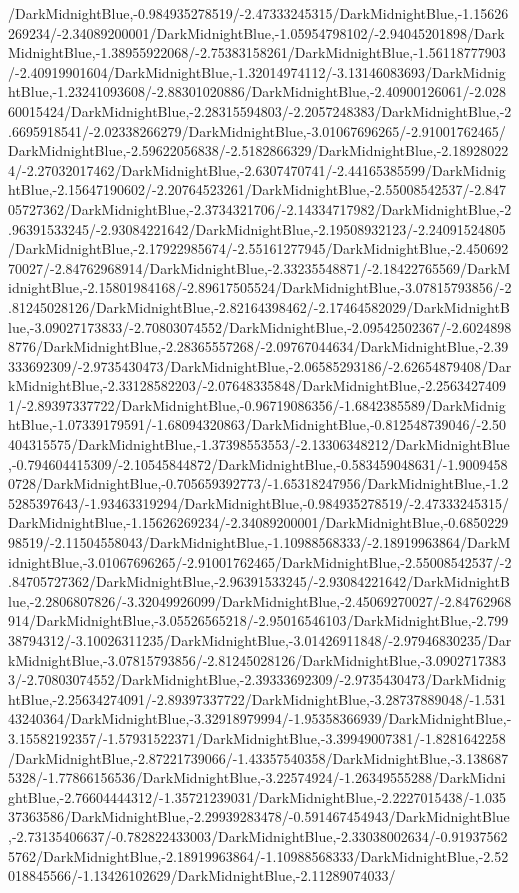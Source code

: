 {\begin{tikzternal}
/DarkMidnightBlue,-0.984935278519/-2.47333245315/DarkMidnightBlue,-1.15626269234/-2.34089200001/DarkMidnightBlue,-1.05954798102/-2.94045201898/DarkMidnightBlue,-1.38955922068/-2.75383158261/DarkMidnightBlue,-1.56118777903/-2.40919901604/DarkMidnightBlue,-1.32014974112/-3.13146083693/DarkMidnightBlue,-1.23241093608/-2.88301020886/DarkMidnightBlue,-2.40900126061/-2.02860015424/DarkMidnightBlue,-2.28315594803/-2.2057248383/DarkMidnightBlue,-2.6695918541/-2.02338266279/DarkMidnightBlue,-3.01067696265/-2.91001762465/DarkMidnightBlue,-2.59622056838/-2.5182866329/DarkMidnightBlue,-2.189280224/-2.27032017462/DarkMidnightBlue,-2.6307470741/-2.44165385599/DarkMidnightBlue,-2.15647190602/-2.20764523261/DarkMidnightBlue,-2.55008542537/-2.84705727362/DarkMidnightBlue,-2.3734321706/-2.14334717982/DarkMidnightBlue,-2.96391533245/-2.93084221642/DarkMidnightBlue,-2.19508932123/-2.24091524805/DarkMidnightBlue,-2.17922985674/-2.55161277945/DarkMidnightBlue,-2.45069270027/-2.84762968914/DarkMidnightBlue,-2.33235548871/-2.18422765569/DarkMidnightBlue,-2.15801984168/-2.89617505524/DarkMidnightBlue,-3.07815793856/-2.81245028126/DarkMidnightBlue,-2.82164398462/-2.17464582029/DarkMidnightBlue,-3.09027173833/-2.70803074552/DarkMidnightBlue,-2.09542502367/-2.60248988776/DarkMidnightBlue,-2.28365557268/-2.09767044634/DarkMidnightBlue,-2.39333692309/-2.9735430473/DarkMidnightBlue,-2.06585293186/-2.62654879408/DarkMidnightBlue,-2.33128582203/-2.07648335848/DarkMidnightBlue,-2.25634274091/-2.89397337722/DarkMidnightBlue,-0.96719086356/-1.6842385589/DarkMidnightBlue,-1.07339179591/-1.68094320863/DarkMidnightBlue,-0.812548739046/-2.50404315575/DarkMidnightBlue,-1.37398553553/-2.13306348212/DarkMidnightBlue,-0.794604415309/-2.10545844872/DarkMidnightBlue,-0.583459048631/-1.90094580728/DarkMidnightBlue,-0.705659392773/-1.65318247956/DarkMidnightBlue,-1.25285397643/-1.93463319294/DarkMidnightBlue,-0.984935278519/-2.47333245315/DarkMidnightBlue,-1.15626269234/-2.34089200001/DarkMidnightBlue,-0.685022998519/-2.11504558043/DarkMidnightBlue,-1.10988568333/-2.18919963864/DarkMidnightBlue,-3.01067696265/-2.91001762465/DarkMidnightBlue,-2.55008542537/-2.84705727362/DarkMidnightBlue,-2.96391533245/-2.93084221642/DarkMidnightBlue,-2.2806807826/-3.32049926099/DarkMidnightBlue,-2.45069270027/-2.84762968914/DarkMidnightBlue,-3.05526565218/-2.95016546103/DarkMidnightBlue,-2.79938794312/-3.10026311235/DarkMidnightBlue,-3.01426911848/-2.97946830235/DarkMidnightBlue,-3.07815793856/-2.81245028126/DarkMidnightBlue,-3.09027173833/-2.70803074552/DarkMidnightBlue,-2.39333692309/-2.9735430473/DarkMidnightBlue,-2.25634274091/-2.89397337722/DarkMidnightBlue,-3.28737889048/-1.53143240364/DarkMidnightBlue,-3.32918979994/-1.95358366939/DarkMidnightBlue,-3.15582192357/-1.57931522371/DarkMidnightBlue,-3.39949007381/-1.8281642258/DarkMidnightBlue,-2.87221739066/-1.43357540358/DarkMidnightBlue,-3.1386875328/-1.77866156536/DarkMidnightBlue,-3.22574924/-1.26349555288/DarkMidnightBlue,-2.76604444312/-1.35721239031/DarkMidnightBlue,-2.2227015438/-1.03537363586/DarkMidnightBlue,-2.29939283478/-0.591467454943/DarkMidnightBlue,-2.73135406637/-0.782822433003/DarkMidnightBlue,-2.33038002634/-0.919375625762/DarkMidnightBlue,-2.18919963864/-1.10988568333/DarkMidnightBlue,-2.52018845566/-1.13426102629/DarkMidnightBlue,-2.11289074033/
\end{tikzternal}}
